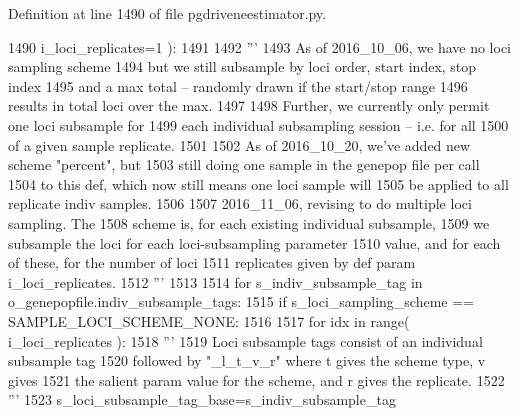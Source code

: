 Definition at line 1490 of file pgdriveneestimator.\+py.


\begin{DoxyCode}
1490                         i\_loci\_replicates=1 ):
1491         
1492     \textcolor{stringliteral}{'''}
1493 \textcolor{stringliteral}{    As of 2016\_10\_06, we have no loci sampling scheme}
1494 \textcolor{stringliteral}{    but we still subsample by loci order, start index, stop index}
1495 \textcolor{stringliteral}{    and a max total -- randomly drawn if the start/stop range}
1496 \textcolor{stringliteral}{    results in total loci over the max. }
1497 \textcolor{stringliteral}{}
1498 \textcolor{stringliteral}{    Further, we currently only permit one loci subsample for}
1499 \textcolor{stringliteral}{    each individual subsampling session -- i.e. for all }
1500 \textcolor{stringliteral}{    of a given sample replicate.}
1501 \textcolor{stringliteral}{}
1502 \textcolor{stringliteral}{    As of 2016\_10\_20, we've added new scheme "percent", but}
1503 \textcolor{stringliteral}{    still doing one sample in the genepop file per call}
1504 \textcolor{stringliteral}{    to this def, which now still means one loci sample will}
1505 \textcolor{stringliteral}{    be applied to all replicate indiv samples.}
1506 \textcolor{stringliteral}{}
1507 \textcolor{stringliteral}{    2016\_11\_06, revising to do multiple loci sampling.  The}
1508 \textcolor{stringliteral}{    scheme is, for each existing individual subsample,}
1509 \textcolor{stringliteral}{    we subsample the loci for each loci-subsampling parameter}
1510 \textcolor{stringliteral}{    value, and for each of these, for the number of loci}
1511 \textcolor{stringliteral}{    replicates given by def param i\_loci\_replicates.}
1512 \textcolor{stringliteral}{    '''}
1513 
1514     \textcolor{keywordflow}{for} s\_indiv\_subsample\_tag \textcolor{keywordflow}{in} o\_genepopfile.indiv\_subsample\_tags:
1515         \textcolor{keywordflow}{if} s\_loci\_sampling\_scheme == SAMPLE\_LOCI\_SCHEME\_NONE:
1516 
1517             \textcolor{keywordflow}{for} idx \textcolor{keywordflow}{in} range( i\_loci\_replicates ):
1518                 \textcolor{stringliteral}{'''}
1519 \textcolor{stringliteral}{                Loci subsample tags consist of an individual subsample tag}
1520 \textcolor{stringliteral}{                followed by "\_l\_t\_v\_r" where t gives the scheme type, v gives}
1521 \textcolor{stringliteral}{                the salient param value for the scheme, and r gives the replicate.}
1522 \textcolor{stringliteral}{                '''}
1523                 s\_loci\_subsample\_tag\_base=s\_indiv\_subsample\_tag

\end{DoxyCode}
